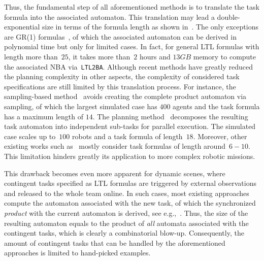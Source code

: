 Thus, the fundamental step of all aforementioned methods is to translate the task formula into
the associated automaton.
This translation may lead a double-exponential size
in terms of the formula length as shown in~\cite{10.1007/3-540-44585-4_6}.
The only exceptions are GR(1) formulas~\cite{10.1007/11609773_24}, of which the associated automaton
can be derived in polynomial time but only for limited cases.
In fact, for general LTL formulas with length more than~$25$,
it takes more than~$2$ hours and $13 GB$ memory to compute the associated NBA via~\texttt{LTL2BA}.
Although recent methods have greatly reduced the planning complexity in other aspects,
the complexity of considered task specifications are still limited by this translation process.
For instance, the sampling-based method~\cite{kantaros2020stylus}
avoids creating the complete product automaton via sampling,
of which the largest simulated case has $400$ agents and
the task formula has a maximum length of $14$.
The planning method~\cite{schillinger2018simultaneous} decomposes the resulting task automaton
into independent sub-tasks for parallel execution.
The simulated case scales up to~$100$ robots and a task formula of length~$18$.
Moreover, other existing works such
as~\cite{2021Reactive,2018Multi,6942756,7487762} mostly
{consider} task formulas of length around~$6-10$.
This limitation hinders greatly its application to more complex robotic missions.



This drawback becomes even more apparent for dynamic scenes,
where contingent tasks specified as LTL formulas are triggered by external observations
and released to the whole team online.
In such cases, most existing approaches compute
the automaton associated with the new task, of which the synchronized
{\emph{product} with the current automaton is derived, see e.g.,~\cite{6942756, 7487762}}.
Thus, the size of the resulting automaton equals to the product
of \emph{all} automata associated with the contingent tasks,
which is clearly a combinatorial blow-up.
Consequently, the amount of contingent tasks that can be
handled by the aforementioned
approaches is limited to hand-picked examples.

